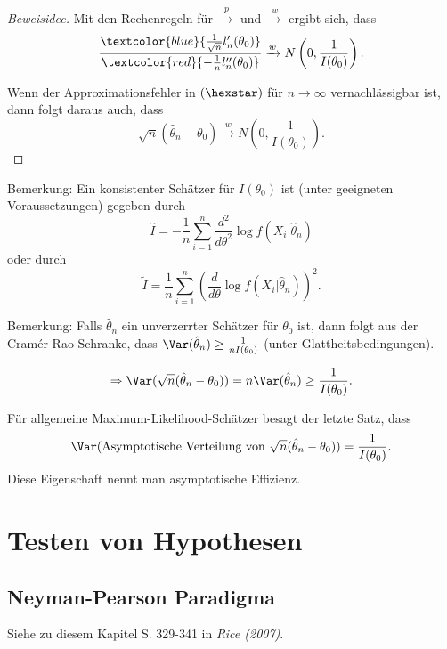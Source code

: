\documentclass{tstextbook}
\begin{document}
\begin{proof}[Beweisidee]
		Mit den Rechenregeln für $ \xrightarrow{p} $ und $ \xrightarrow{w} $ ergibt sich, dass
		\[
		\frac{\textcolor{blue}{\frac{1}{\sqrt{n}}l_n^\prime(\theta_0)}}{\textcolor{red}{-\frac{1}{n}l_n^{\prime\prime}(\theta_0)}} \xrightarrow{w} N\left(0,\frac{1}{I(\theta_0)}\right).
		\]
		
		Wenn der Approximationsfehler in $ (\hexstar) $ für $ n\to\infty $ vernachlässigbar ist, dann folgt daraus auch, dass 
		\[
		\sqrt{n}(\hat{\theta}_n-\theta_0) \xrightarrow{w} N\left(0,\frac{1}{I(\theta_0)}\right).
		\]
	\end{proof}
	
	\begin{remark}
		Bemerkung: Ein konsistenter Schätzer für $ I(\theta_0) $ ist (unter geeigneten Voraussetzungen) gegeben durch 
		\[
		\hat{I} = -\frac{1}{n}\sum_{i=1}^{n}\frac{d^2}{d\theta^2}\log f(X_i|\hat{\theta}_n)
		\] oder durch
		\[
		\tilde{I} = \frac{1}{n}\sum_{i=1}^{n}\left(\frac{d}{d\theta}\log f(X_i|\hat{\theta}_n)\right)^2.
		\]
	\end{remark}

	\begin{remark}
		Bemerkung: Falls $ \hat{\theta}_n $ ein unverzerrter Schätzer für $ \theta_0 $ ist, dann folgt aus der Cramér-Rao-Schranke, dass $ \Var(\hat{\theta}_n) \ge \frac{1}{nI(\theta_0)}$ (unter Glattheitsbedingungen).
		
		\[ \Rightarrow \Var(\sqrt{n}(\hat{\theta}_n-\theta_0)) = n\Var(\hat{\theta}_n) \ge \frac{1}{I(\theta_0)} .
		\] 
		
		Für allgemeine Maximum-Likelihood-Schätzer besagt der letzte Satz, dass 
		\[
		\Var(\text{Asymptotische Verteilung von }\sqrt{n}(\hat{\theta}_n-\theta_0))=\frac{1}{I(\theta_0)}.
		\]
		Diese Eigenschaft nennt man asymptotische Effizienz.
	\end{remark}


\chapter{Testen von Hypothesen}

\section{Neyman-Pearson Paradigma}
	\begin{book}
	Siehe zu diesem Kapitel S. 329-341 in	\textit{Rice (2007)}.
\end{book}
\end{document}
